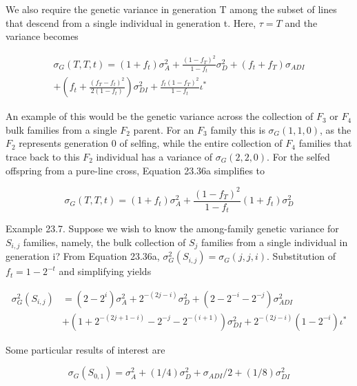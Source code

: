 \documentclass{article}
\begin{document}
We also require the genetic variance in generation T among the subset of lines that descend from a single individual in generation t. Here,  $ \tau = T $ and the variance becomes

\begin{equation}
\begin{aligned}\sigma_{G}(T,T,t)=(1+f_{t})\sigma_{A}^{2}+\frac{(1-f_{T})^{2}}{1-f_{t}}\sigma_{D}^{2}+(f_{t}+f_{T})\sigma_{ADI}\\+\left(f_{t}+\frac{(f_{T}-f_{t})^{2}}{2(1-f_{t})}\right)\sigma_{DI}^{2}+\frac{f_{t}(1-f_{T})^{2}}{1-f_{t}}\iota^{*}\end{aligned}
\tag{23.36a}
\label{eq:23_36a}
\end{equation}

An example of this would be the genetic variance across the collection of  $ F_3 $ or  $ F_4 $ bulk families from a single  $ F_2 $ parent. For an  $ F_3 $ family this is  $ \sigma_G(1,1,0) $, as the  $ F_2 $ represents generation 0 of selfing, while the entire collection of  $ F_4 $ families that trace back to this  $ F_2 $ individual has a variance of  $ \sigma_G(2,2,0) $. For the selfed offspring from a pure-line cross, Equation 23.36a simplifies to

\begin{equation}
\sigma_{G}(T,T,t)=(1+f_{t})\sigma_{A}^{2}+\frac{(1-f_{T})^{2}}{1-f_{t}}\left(1+f_{t}\right)\sigma_{D}^{2}
\tag{23.36b}
\label{eq:23_36b}
\end{equation}

Example 23.7. Suppose we wish to know the among-family genetic variance for  $ S_{i,j} $ families, namely, the bulk collection of  $ S_j $ families from a single individual in generation i? From Equation 23.36a,  $ \sigma_G^2(S_{i,j}) = \sigma_G(j, j, i) $. Substitution of  $ f_t = 1 - 2^{-t} $ and simplifying yields

\begin{equation}
\begin{aligned}\sigma_{G}^{2}(S_{i,j})&=(2-2^{i})\sigma_{A}^{2}+2^{-(2j-i)}\sigma_{D}^{2}+(2-2^{-i}-2^{-j})\sigma_{ADI}^{2}\\&+\left(1+2^{-(2j+1-i)}-2^{-j}-2^{-(i+1)}\right)\sigma_{DI}^{2}+2^{-(2j-i)}\left(1-2^{-i}\right)\iota^{*}\end{aligned}
\end{equation}

Some particular results of interest are

\begin{equation}
\sigma_{G}(S_{0,1})=\sigma_{A}^{2}+(1/4)\sigma_{D}^{2}+\sigma_{ADI}/2+(1/8)\sigma_{DI}^{2}
\end{equation}
\end{document}
